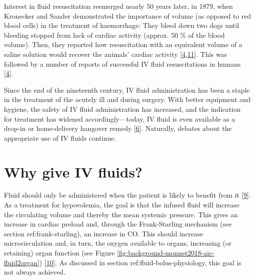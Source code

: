 \documentclass[a4paper, nobind]{templates/ociamthesis}
\begin{document}
Interest in fluid resuscitation reemerged nearly 50 years later, in 1879, when Kronecker and Sander demonstrated the importance of volume (as opposed to red blood cells) in the treatment of haemorrhage: They bleed down two dogs until bleeding stopped from lack of cardiac activity (approx. 50 \% of the blood volume). Then, they reported how resuscitation with an equivalent volume of a saline solution would recover the animals' cardiac activity {[}\protect\hyperlink{ref-foexHowCholeraEpidemic2003}{4},\protect\hyperlink{ref-petroianuSalineInfusionClonus2021}{11}{]}. This was followed by a number of reports of successful IV fluid resuscitations in humans {[}\protect\hyperlink{ref-foexHowCholeraEpidemic2003}{4}{]}.

Since the end of the nineteenth century, IV fluid administration has been a staple in the treatment of the acutely ill and during surgery. With better equipment and hygiene, the safety of IV fluid administration has increased, and the indication for treatment has widened accordingly---today, IV fluid is even available as a drop-in or home-delivery hangover remedy {[}\protect\hyperlink{ref-kadetHouseCallsHangovers2015}{6}{]}. Naturally, debates about the appropriate use of IV fluids continue.

\hypertarget{why-fluid}{%
\section{Why give IV fluids?}\label{why-fluid}}

Fluid should only be administered when the patient is likely to benefit from it {[}\protect\hyperlink{ref-millerPerioperativeFluidTherapy2019}{9}{]}. As a treatment for hypovolemia, the goal is that the infused fluid will increase the circulating volume and thereby the mean systemic pressure. This gives an increase in cardiac preload and, through the Frank-Starling mechanism (see section ref:frank-starling), an increase in CO. This should increase microcirculation and, in turn, the oxygen available to organs, increasing (or retaining) organ function (see Figure \ref{fig:background-monnet2018-aic-fluid2organ}) {[}\protect\hyperlink{ref-monnetMyPatientHas2018}{10}{]}. As discussed in section ref:fluid-bolus-physiology, this goal is not always achieved.
\end{document}
